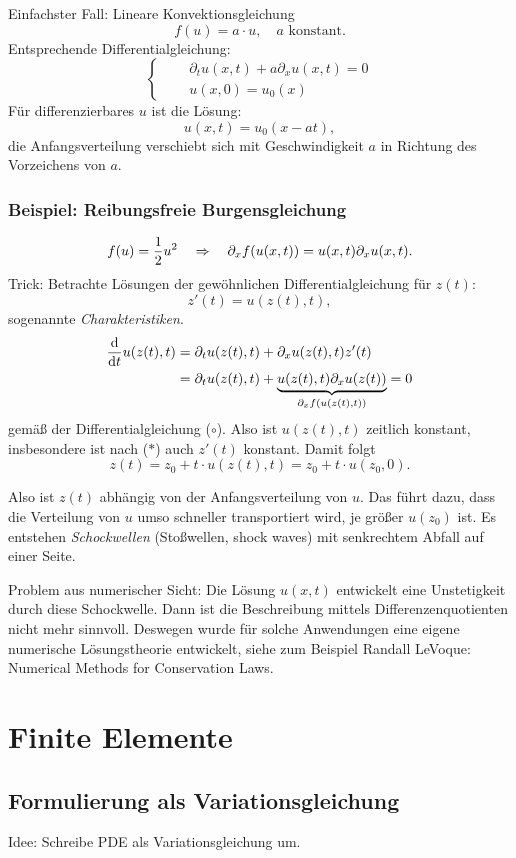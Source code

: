 Einfachster Fall: Lineare Konvektionsgleichung
\[ f(u) = a \cdot u, \quad a \text{ konstant}. \]
Entsprechende Differentialgleichung:
\[ \left\{ \quad \begin{aligned}
      &\partial_t u (x,t) + a \partial_x u(x,t) = 0 \\
      &u(x,0) = u_0(x)
    \end{aligned} \right. \]
Für differenzierbares $u$ ist die Lösung:
\[ u(x,t) = u_0(x-at), \]
die Anfangsverteilung verschiebt sich mit Geschwindigkeit $a$ in Richtung des
Vorzeichens von $a$.

\subsubsection*{Beispiel: Reibungsfreie Burgensgleichung}
\[ f(u) = \frac{1}{2} u^2 \quad \Rightarrow \quad \partial_x f(u(x,t)) = u(x,t) \partial_x u(x,t). \]
Trick: Betrachte Lösungen der gewöhnlichen Differentialgleichung für $z(t)$:
\[ z'(t) = u(z(t),t), \tag{$*$} \]
sogenannte \emph{Charakteristiken}.
\begin{align*}
  \frac{\mathrm{d} }{\mathrm{d} t} u(z(t),t) 
  &= \partial_t u(z(t),t) + \partial_x u(z(t),t) z'(t) \\
  &= \partial_t u(z(t),t) + \underbrace{u(z(t),t) \partial_x u(z(t))}_{
    \partial_x f(u(z(t),t))
    } = 0
\end{align*}
gemäß der Differentialgleichung ($\circ$). Also ist $u(z(t),t)$ zeitlich
konstant, insbesondere ist nach ($*$) auch $z'(t)$ konstant. Damit folgt
\[ z(t) = z_0 + t \cdot u(z(t),t) = z_0 + t \cdot u( z_0, 0 ). \]

Also ist $z(t)$ abhängig von der Anfangsverteilung von $u$. Das führt dazu, dass
die Verteilung von $u$ umso schneller transportiert wird, je größer $u(z_0)$
ist. Es entstehen \emph{Schockwellen} (Stoßwellen, shock waves) mit senkrechtem
Abfall auf einer Seite.

Problem aus numerischer Sicht: Die Lösung $u(x,t)$ entwickelt eine Unstetigkeit
durch diese Schockwelle. Dann ist die Beschreibung mittels Differenzenquotienten
nicht mehr sinnvoll. Deswegen wurde für solche Anwendungen eine eigene
numerische Lösungstheorie entwickelt, siehe zum Beispiel Randall LeVoque:
Numerical Methods for Conservation Laws.

\section{Finite Elemente} %
\subsection{Formulierung als Variationsgleichung}
Idee: Schreibe PDE als Variationsgleichung um.


